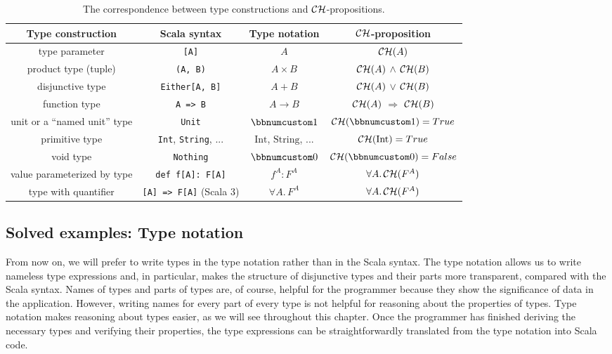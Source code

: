 \begin{table}
\begin{centering}
\begin{tabular}{|c|c|c|c|}
\hline 
\textbf{\small{}Type construction} & \textbf{\small{}Scala syntax} & \textbf{\small{}Type notation} & \textbf{\small{}${\cal CH}$-proposition}\tabularnewline
\hline 
\hline 
{\small{}type parameter} & \lstinline![A]! & $A$ & ${\cal CH}(A)$\tabularnewline
\hline 
{\small{}product type (tuple)}  & \lstinline!(A, B)! & $A\times B$ & ${\cal CH}(A)$ $\wedge$ ${\cal CH}(B)$\tabularnewline
\hline 
{\small{}disjunctive type}  & \lstinline!Either[A, B]! & $A+B$ & ${\cal CH}(A)$ $\vee$ ${\cal CH}(B)$\tabularnewline
\hline 
{\small{}function type}  & \lstinline!A => B! & $A\rightarrow B$ & ${\cal CH}(A)$ $\Rightarrow$ ${\cal CH}(B)$\tabularnewline
\hline 
{\small{}unit or a ``named unit'' type} & \lstinline!Unit! & $\bbnum 1$ & ${\cal CH}(\bbnum 1)=True$\tabularnewline
\hline 
{\small{}primitive type} & {\small{}}\lstinline!Int!{\small{}, }\lstinline!String!{\small{},
...} & {\small{}$\text{Int}$, $\text{String}$, ...} & ${\cal CH}(\text{Int})=True$\tabularnewline
\hline 
{\small{}void type} & \lstinline!Nothing! & $\bbnum 0$ & ${\cal CH}(\bbnum 0)=False$\tabularnewline
\hline 
{\small{}value parameterized by type} & \lstinline!def f[A]: F[A]! & $f^{A}:F^{A}$ & $\forall A.\,{\cal CH}(F^{A})$\tabularnewline
\hline 
{\small{}type with quantifier} & \lstinline![A] => F[A]!{\small{} (Scala 3)} & $\forall A.\,F^{A}$ & $\forall A.\,{\cal CH}(F^{A})$\tabularnewline
\hline 
\end{tabular}
\par\end{centering}
\caption{The correspondence between type constructions and ${\cal CH}$-propositions.\label{tab:ch-correspondence-type-notation-CH-propositions}}
\end{table}


\subsection{Solved examples: Type notation}

From now on, we will prefer to write types in the type notation rather
than in the Scala syntax. The type notation allows us to write nameless
type expressions and, in particular, makes the structure of disjunctive
types and their parts more transparent, compared with the Scala syntax.
Names of types and parts of types are, of course, helpful for the
programmer because they show the significance of data in the application.
However, writing names for every part of every type is not helpful
for reasoning about the properties of types. Type notation makes reasoning
about types easier, as we will see throughout this chapter. Once the
programmer has finished deriving the necessary types and verifying
their properties, the type expressions can be straightforwardly translated
from the type notation into Scala code.

